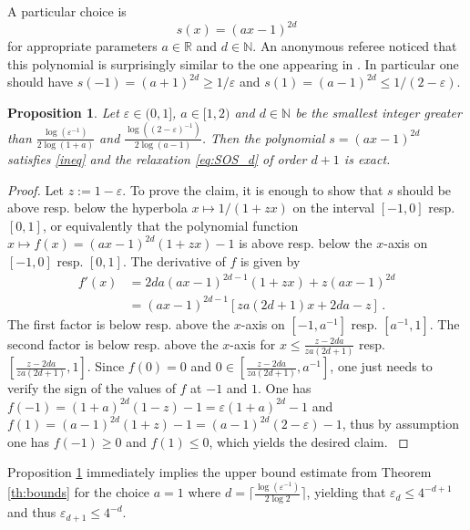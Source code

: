 \documentclass[a4paper,12pt]{article}
\newcommand{\R}{\mathbb{R}} %
\newcommand{\N}{\mathbb{N}} %
\newtheorem{proposition}{Proposition}
\begin{document}
A particular choice is
\[
s(x) = (ax-1)^{2d}
\]
for appropriate parameters $a \in \R$ and $d \in \N$. 
{An anonymous referee noticed that this polynomial is surprisingly similar to the one appearing in \cite[Eq.~(11)]{ns07}. 
}
In particular one should have $s(-1)=(a+1)^{2d} \geq 1/\varepsilon$ 
and $s(1)=(a-1)^{2d} \leq 1/(2-\varepsilon)$.  

\begin{proposition}
\label{prop:Paulynomial}
Let $\varepsilon \in (0,1]$, $a \in [1, 2)$ and $d \in \N$ be the {smallest integer} greater than 
$\frac{\log (\varepsilon^{-1})}{2 \log (1+a)}$ and 
$\frac{\log ((2 - \varepsilon)^{-1}) }{2 \log (a - 1)}$. 
Then the polynomial $s = (ax-1)^{2d}$ satisfies \eqref{ineq} and the relaxation \eqref{eq:SOS_d} of order $d+1$ is exact. 
\end{proposition}
%
\begin{proof}
Let $z:=1-\varepsilon$. 
To prove the claim, it is enough to show that $s$ should be above resp. below the hyperbola $x \mapsto 1/(1+zx)$ on the interval $[-1, 0]$ resp. $[0, 1]$, or equivalently that the polynomial function $x \mapsto f(x) = (ax-1)^{2d} (1+zx) - 1$ is above resp. below the $x$-axis on $[-1, 0]$ resp. $[0, 1]$. 
The derivative of $f$ is given by {
\begin{align*}
f'(x) & = 2d a (ax-1)^{2d-1} (1+zx) + z (ax-1)^{2d} \\
& = (ax-1)^{2d-1} [za(2d+1)x + 2da - z] \,.
\end{align*}
The first factor is below resp. above the $x$-axis on $[-1, a^{-1}]$ resp. $[a^{-1}, 1]$. 
The second factor is below resp. above the $x$-axis for $x \leq \frac{z-2da}{za(2d+1)}$ resp. $[\frac{z-2da}{za(2d+1)}, 1]$. 
Since $f(0)=0$ and $0 \in [\frac{z-2da}{za(2d+1)}, a^{-1}]$, one just needs to verify the sign of the values of $f$ at $-1$ and $1$. 
%
One has $f(-1) = (1+a)^{2d} (1 - z) - 1 = \varepsilon (1+a)^{2d} - 1$ and $f(1) = (a-1)^{2d} (1+z) - 1 = (a-1)^{2d} (2-\varepsilon) - 1$, thus by assumption one has $f(-1) \ge 0$ and $f(1) \le 0$, which yields the desired claim. }
%
\end{proof}
%
{
Proposition \ref{prop:Paulynomial} immediately implies the upper bound estimate from Theorem \ref{th:bounds} for the choice $a=1$ where $d = \lceil \frac{\log (\varepsilon^{-1})}{2 \log 2} \rceil $, yielding that $\varepsilon_d \leq 4^{-d+1}$ and thus $\varepsilon_{d+1} \leq 4^{-d}$. 
}
\end{document}
